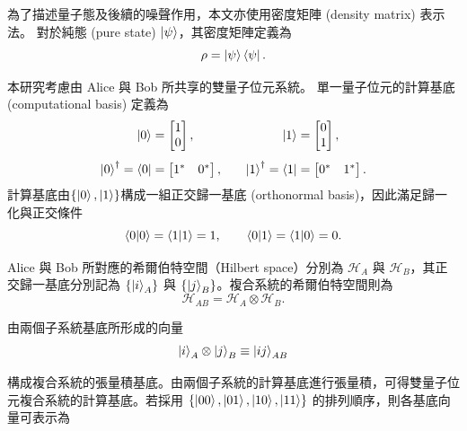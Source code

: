 \documentclass[12pt, a4paper, twoside, reqno]{article}
\begin{document}
\indent 為了描述量子態及後續的噪聲作用，本文亦使用密度矩陣 (density matrix) 表示法。
對於純態 (pure state) $\ket{\psi}$，其密度矩陣定義為
\begin{equation}
    \rho=\ket{\psi}\bra{\psi}.
    \label{eq:pure-state-density-matrix}
\end{equation}


\indent 本研究考慮由 Alice 與 Bob 所共享的雙量子位元系統。
單一量子位元的計算基底 (computational basis) 定義為
\[
    \begin{alignedat}{2}
        \ket{0}&=
        \begin{bmatrix}
            1\\
            0
        \end{bmatrix},
        \qquad&
        \ket{1}&=
        \begin{bmatrix}
            0\\
            1
        \end{bmatrix},
        \\[4pt]
        \ket{0}^\dagger = \bra{0}&=
        \begin{bmatrix}
            1^* & 0^*
        \end{bmatrix},
        \qquad&
        \ket{1}^\dagger = \bra{1}&=
        \begin{bmatrix}
            0^* & 1^*
        \end{bmatrix}.
    \end{alignedat}
    \label{eq:computational-basis}
\]
\noindent 計算基底由$\{\ket{0},\ket{1}\}$構成一組正交歸一基底 (orthonormal basis)，因此滿足歸一化與正交條件
\[
    \braket{0|0} = \braket{1|1} = 1,\qquad\braket{0|1} = \braket{1|0} = 0.
\]

\indent Alice 與 Bob 所對應的希爾伯特空間（Hilbert space）分別為
$\mathcal{H}_A$ 與 $\mathcal{H}_B$，其正交歸一基底分別記為
$\{\ket{i}_A\}$ 與 $\{\ket{j}_B\}$。複合系統的希爾伯特空間則為
\begin{equation}
    \mathcal{H}_{AB}=\mathcal{H}_A\otimes\mathcal{H}_B.
\end{equation}

\noindent 由兩個子系統基底所形成的向量
\[
    \ket{i}_A\otimes\ket{j}_B
    \equiv
    \ket{ij}_{AB}
\]

\noindent 構成複合系統的張量積基底。由兩個子系統的計算基底進行張量積，可得雙量子位元複合系統的計算基底。若採用
$\{\ket{00},\ket{01},\ket{10},\ket{11}\}$ 的排列順序，則各基底向量可表示為
\end{document}
